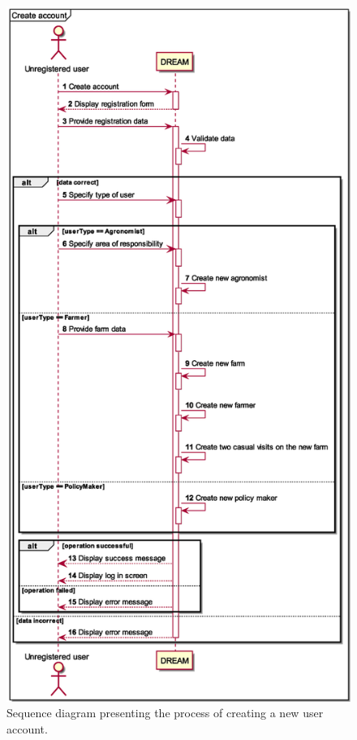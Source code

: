 
\begin{figure}[H]
    \centering
    \includegraphics[scale=0.5, keepaspectratio, origin=c]{diagrams/sequence/create_account}
    \caption{Sequence diagram presenting the process of creating a new user account.}
    \label{fig:sd_create_account}
\end{figure}

